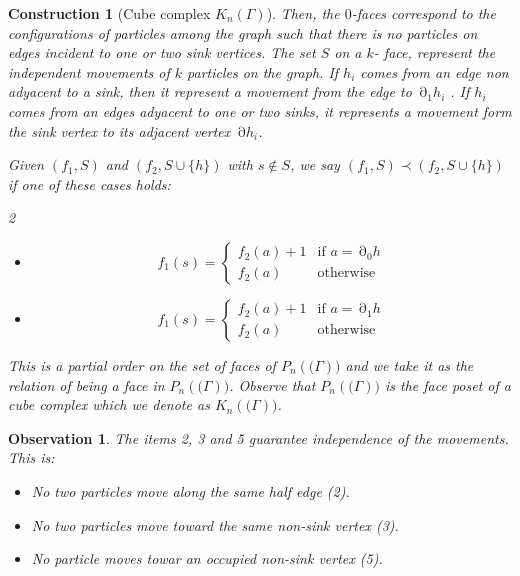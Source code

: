 \documentclass{article}
\DeclareMathOperator{\bnd}{\partial}
\newtheorem{construction}{Construction}
\newtheorem*{observation*}{Observation}
\begin{document}
\begin{construction}[Cube complex $K_n(\mathsf{\Gamma})$]
 Then, the $0$-faces correspond to the configurations of particles among the graph such that there is no particles on edges incident to one or two sink vertices. The set $S$ on a $k$- face, represent the independent movements of $k$ particles on the graph. If $h_i$ comes from an edge non adyacent to a sink, then it represent a movement from the edge to $\bnd_1 h_i$ . If $h_i$ comes from an edges adyacent to one or two sinks, it represents a movement form the sink vertex to its adjacent vertex $\bnd h_i$.

 Given $(f_1, S)$ and $(f_2, S\cup\{h\})$ with $s\notin S$, we say $(f_1, S) \prec (f_2, S\cup \{h\})$ if one of these cases holds:

 \begin{multicols}{2}
 \begin{itemize}
    \item[(i)] \[f_1(s)= \begin{cases} 
      f_2(a)+1 & \text{if   }a= \bnd_0h \\
      f_2(a) & \text{otherwise}
   \end{cases}
\]

\item[(ii)] \[f_1(s)= \begin{cases} 
      f_2(a)+1 & \text{if   }a= \bnd_1h \\
      f_2(a) & \text{otherwise}
   \end{cases}
\]
\end{itemize}
\end{multicols}

This is a partial order on the set of faces of $P_n(\mathsf(\Gamma))$ and we take it as the relation of being a face in $P_n(\mathsf(\Gamma))$. Observe that $P_n(\mathsf(\Gamma))$ is the face poset of a cube complex which we denote as $K_n(\mathsf(\Gamma))$.
   



\end{construction}

\begin{observation*}
The items 2,  3 and 5 guarantee independence of the movements. This is:
\begin{itemize}
    \item No two particles move along the same half edge (2).
    \item No two particles move toward the same non-sink vertex (3).
    \item No particle moves towar an occupied non-sink vertex (5).
\end{itemize}
\end{observation*}
\end{document}
